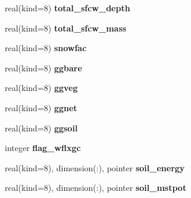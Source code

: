 \begin{DoxyCompactItemize}
\item 
\hypertarget{structrk4__coms_1_1rk4patchtype_a83c6c4f108f8f222d17ef271d8bdbdd8}{
real(kind=8) {\bfseries total\_\-sfcw\_\-depth}}
\label{structrk4__coms_1_1rk4patchtype_a83c6c4f108f8f222d17ef271d8bdbdd8}

\item 
\hypertarget{structrk4__coms_1_1rk4patchtype_ac1d59ef3d393cc281ca923b9bcaa5743}{
real(kind=8) {\bfseries total\_\-sfcw\_\-mass}}
\label{structrk4__coms_1_1rk4patchtype_ac1d59ef3d393cc281ca923b9bcaa5743}

\item 
\hypertarget{structrk4__coms_1_1rk4patchtype_ac3f1af6e189e62ddf1c37b0e442a26b2}{
real(kind=8) {\bfseries snowfac}}
\label{structrk4__coms_1_1rk4patchtype_ac3f1af6e189e62ddf1c37b0e442a26b2}

\item 
\hypertarget{structrk4__coms_1_1rk4patchtype_a9a81315e9e44321708873e7939a530ae}{
real(kind=8) {\bfseries ggbare}}
\label{structrk4__coms_1_1rk4patchtype_a9a81315e9e44321708873e7939a530ae}

\item 
\hypertarget{structrk4__coms_1_1rk4patchtype_a9f3ffeb0b8738497f3a9f93f0d0da759}{
real(kind=8) {\bfseries ggveg}}
\label{structrk4__coms_1_1rk4patchtype_a9f3ffeb0b8738497f3a9f93f0d0da759}

\item 
\hypertarget{structrk4__coms_1_1rk4patchtype_a5fdfba5f5c3669a0560a8fb63709236b}{
real(kind=8) {\bfseries ggnet}}
\label{structrk4__coms_1_1rk4patchtype_a5fdfba5f5c3669a0560a8fb63709236b}

\item 
\hypertarget{structrk4__coms_1_1rk4patchtype_a88054f6513194f2af58c5112fe7a6a56}{
real(kind=8) {\bfseries ggsoil}}
\label{structrk4__coms_1_1rk4patchtype_a88054f6513194f2af58c5112fe7a6a56}

\item 
\hypertarget{structrk4__coms_1_1rk4patchtype_ab08b5f5880f332383b485763925a2a33}{
integer {\bfseries flag\_\-wflxgc}}
\label{structrk4__coms_1_1rk4patchtype_ab08b5f5880f332383b485763925a2a33}

\item 
\hypertarget{structrk4__coms_1_1rk4patchtype_a26ef368fc2cb348e7f3a946d0ae05ecb}{
real(kind=8), dimension(:), pointer {\bfseries soil\_\-energy}}
\label{structrk4__coms_1_1rk4patchtype_a26ef368fc2cb348e7f3a946d0ae05ecb}

\item 
\hypertarget{structrk4__coms_1_1rk4patchtype_a10ad4909bb1219eed191f679e3b58fd7}{
real(kind=8), dimension(:), pointer {\bfseries soil\_\-mstpot}}
\label{structrk4__coms_1_1rk4patchtype_a10ad4909bb1219eed191f679e3b58fd7}


\end{DoxyCompactItemize}
